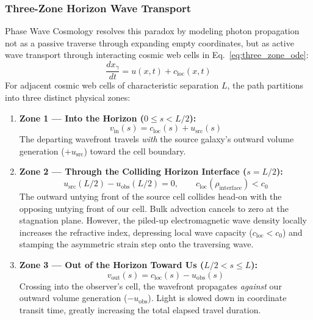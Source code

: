 \documentclass[11pt,a4paper]{article}
\begin{document}
\subsubsection{Three-Zone Horizon Wave Transport}
\label{subsubsec:three_zone_transport}

Phase Wave Cosmology resolves this paradox by modeling photon propagation not as a passive traverse through expanding empty coordinates, but as active wave transport through interacting cosmic web cells in Eq.~\eqref{eq:three_zone_ode}:
\begin{equation}
\frac{dx_\gamma}{dt} = u(x,t) + c_{\text{loc}}(x,t)
\label{eq:three_zone_ode}
\end{equation}
For adjacent cosmic web cells of characteristic separation $L$, the path partitions into three distinct physical zones:
\begin{enumerate}
    \item \textbf{Zone 1 --- Into the Horizon ($0 \le s < L/2$):}
    \begin{equation}
    v_{\text{in}}(s) = c_{\text{loc}}(s) + u_{\text{src}}(s)
    \end{equation}
    The departing wavefront travels \textit{with} the source galaxy's outward volume generation ($+u_{\text{src}}$) toward the cell boundary.
    \item \textbf{Zone 2 --- Through the Colliding Horizon Interface ($s = L/2$):}
    \begin{equation}
    u_{\text{src}}(L/2) - u_{\text{obs}}(L/2) = 0, \qquad c_{\text{loc}}(\rho_{\text{interface}}) < c_0
    \end{equation}
    The outward untying front of the source cell collides head-on with the opposing untying front of our cell. Bulk advection cancels to zero at the stagnation plane. However, the piled-up electromagnetic wave density locally increases the refractive index, depressing local wave capacity ($c_{\text{loc}} < c_0$) and stamping the asymmetric strain step onto the traversing wave.
    \item \textbf{Zone 3 --- Out of the Horizon Toward Us ($L/2 < s \le L$):}
    \begin{equation}
    v_{\text{out}}(s) = c_{\text{loc}}(s) - u_{\text{obs}}(s)
    \end{equation}
    Crossing into the observer's cell, the wavefront propagates \textit{against} our outward volume generation ($-u_{\text{obs}}$). Light is slowed down in coordinate transit time, greatly increasing the total elapsed travel duration.
\end{enumerate}
\end{document}
